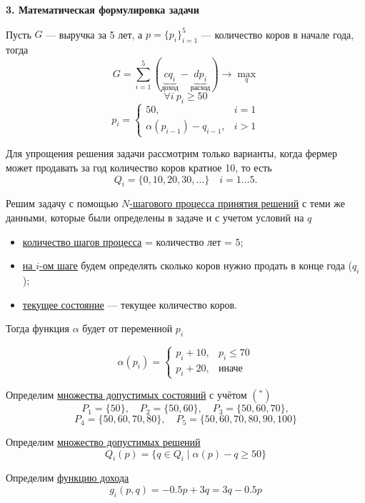 \bigskip

\textbf{3. Математическая формулировка задачи}

Пусть $G$ --- выручка за 5 лет, а $p = \{p_i\}_{i=1}^5$ --- количество коров в начале года, тогда
\[G = \sum_{i=1}^{5} (\underbrace{c q_i}_{\text{доход}} - \underbrace{d p_i}_{\text{расход}}) \to \max_{q}\]
\[\forall  i \ p_i \ge 50\]
\[p_i = \begin{cases}\tag{*}
	50,& i = 1 \\
	\alpha(p_{i - 1}) - q_{i - 1},& i > 1
\end{cases}
\]

\solution
Для упрощения решения задачи рассмотрим только варианты, когда фермер может продавать за год количество коров кратное 10, то есть
\[
Q_i = \{0, 10, 20, 30, \dots\} \quad i = 1 \dots 5.
\]

Решим задачу с помощью \hyperref[n_step_process]{$N$-шагового процесса принятия решений} с теми же данными, которые были определены в задаче и с учетом условий на $q$

\begin{itemize}[nosep]
	\item \underline{количество шагов процесса} = количество лет = $5$;
	
	\item \underline{на $i$-ом шаге} будем определять сколько коров нужно продать в конце года ($q_i$);
	
	\item \underline{текущее состояние} --- текущее количество коров.
\end{itemize}

Тогда функция $\alpha$ будет от переменной $p_i$

\[
\alpha(p_i) = \begin{cases}
	p_i + 10,& p_i \le 70 \\
	p_i + 20,& \text{иначе}
\end{cases}
\]

Определим \underline{множества допустимых состояний} с учётом $(^*)$
\[
P_1 = \{50\}, \quad P_2 = \{50, 60\}, \quad P_3 = \{50, 60, 70\},
\]
\[
P_4 = \{50, 60, 70, 80\}, \quad P_5 = \{50, 60, 70, 80, 90, 100\}
\]

\bigskip

Определим \underline{множество допустимых решений}
\[Q_i(p) = \{q \in Q_i \; \big| \; \alpha(p) - q \ge 50 \}\]

\bigskip

Определим \underline{функцию дохода}
\[g_i(p, q) = -0.5p + 3q = 3q - 0.5p\]

